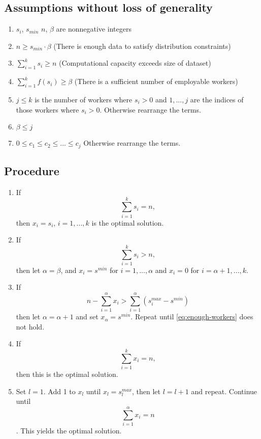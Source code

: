 \documentclass[
    draft,
    final,
]{article}
\begin{document}
    \subsection*{Assumptions without loss of generality}
    \begin{enumerate}
        \item $s_i$, $s_{min}$ $n$, $\beta$ are nonnegative integers
        \item $n \geq s_{min} \cdot \beta$ (There is enough data to satisfy distribution constraints)
        \item $\sum_{i=1}^k s_i \geq n$ (Computational capacity exceeds size of dataset)
        \item $\sum_{i=1}^k f(s_i) \geq \beta$ (There is a sufficient number of employable workers)
        \item $ j \leq k$ is the number of workers where $s_i > 0$ and $1,...,j$ are the indices of those workers where $s_i > 0$. Otherwise rearrange the terms.
        \item $\beta \leq j$
        \item $0 \leq c_1 \leq c_2 \leq ... \leq c_j$ Otherwise rearrange the terms.
    \end{enumerate}
    
    \subsection*{Procedure}
    \begin{enumerate}
        \item If \[ \sum_{i=1}^k s_i = n, \] then $x_i = s_i$, $i = 1,...,k$ is the optimal solution.
        \item If \[\sum_{i=1}^k s_i > n,\] then let $\alpha = \beta$, and $x_i = s^{min}$ for $i = 1,...,\alpha$ and $x_i = 0$ for $i = \alpha + 1,...,k$.
        \item If \begin{equation}
                \label{eq:enough-workers}
                n - \sum_{i=1}^\alpha x_i > \sum_{i=1}^\alpha (s_i^{max} - s^{min})\tag{$*$}
                \end{equation}
        then let $\alpha = \alpha + 1$ and set $x_{\alpha} = s^{min}$. Repeat until \eqref{eq:enough-workers} does not hold.
        \item If \[ \sum_{i=1}^k x_i = n, \] then this is the optimal solution.
        \item Set $l = 1$. Add 1 to $x_l$ until $x_l = s_l^{max}$, then let $l = l+1$ and repeat. Continue until \[ \sum_{i=1}^{\alpha} x_i = n \]. This yields the optimal solution.
        
    \end{enumerate}    
    
\end{document}
